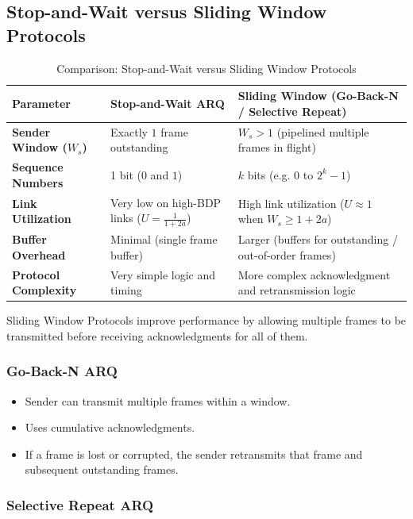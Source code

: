 \subsection{Stop-and-Wait versus Sliding Window Protocols}
\begin{table}[htbp]
\centering
\caption{Comparison: Stop-and-Wait versus Sliding Window Protocols}
\label{tab:stop_and_wait_vs_sliding_window}
\begin{tabularx}{\textwidth}{p{3.8cm} X X}
\toprule
\textbf{Parameter} & \textbf{Stop-and-Wait ARQ} & \textbf{Sliding Window (Go-Back-N / Selective Repeat)} \\
\midrule
\textbf{Sender Window ($W_s$)} & Exactly $1$ frame outstanding & $W_s > 1$ (pipelined multiple frames in flight) \\
\textbf{Sequence Numbers} & 1 bit ($0$ and $1$) & $k$ bits (e.g. $0$ to $2^k-1$) \\
\textbf{Link Utilization} & Very low on high-BDP links ($U = \frac{1}{1+2a}$) & High link utilization ($U \approx 1$ when $W_s \ge 1+2a$) \\
\textbf{Buffer Overhead} & Minimal (single frame buffer) & Larger (buffers for outstanding / out-of-order frames) \\
\textbf{Protocol Complexity} & Very simple logic and timing & More complex acknowledgment and retransmission logic \\
\bottomrule
\end{tabularx}
\end{table}

Sliding Window Protocols improve performance by allowing multiple frames to be transmitted before receiving acknowledgments for all of them.


\subsubsection{Go-Back-N ARQ}

\begin{itemize}
\item Sender can transmit multiple frames within a window.
\item Uses cumulative acknowledgments.
\item If a frame is lost or corrupted, the sender retransmits that frame and subsequent outstanding frames.
\end{itemize}

\subsubsection{Selective Repeat ARQ}

